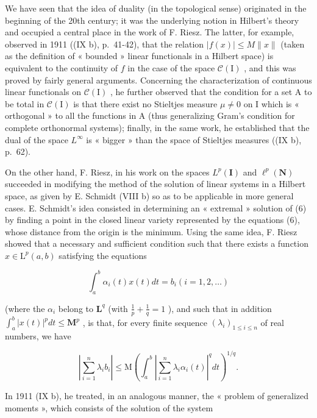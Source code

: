 We have seen that the idea of duality (in the topological sense) originated in the beginning of the 20th century; it was the underlying notion in Hilbert's theory and occupied a central place in the work of F. Riesz. The latter, for example, observed in 1911 ((IX b), p.~41-42), that the relation \(|f(x)| \leqslant M \| x\|\) (taken as the definition of « bounded » linear functionals in a Hilbert space) is equivalent to the continuity of \(f\) in the case of the space \(\mathcal{C}(\mathrm{I})\) , and this was proved by fairly general arguments. Concerning the characterization of continuous linear functionals on \(\mathcal{C}(\mathrm{I})\) , he further observed that the condition for a set A to be total in \(\mathcal{C}(\mathrm{I})\) is that there exist no Stieltjes measure \(\mu \neq 0\) on I which is « orthogonal » to all the functions in A (thus generalizing Gram's condition for complete orthonormal systems); finally, in the same work, he established that the dual of the space \(L^{\infty}\) is « bigger » than the space of Stieltjes measures ((IX b), p.~62).

On the other hand, F. Riesz, in his work on the spaces \(L^{p}(\mathbf{I})\) and \(\ell^{p}(\mathbf{N})\) succeeded in modifying the method of the solution of linear systems in a Hilbert space, as given by E. Schmidt (VIII b) so as to be applicable in more general cases. E. Schmidt's idea consisted in determining an « extremal » solution of (6) by finding a point in the closed linear variety represented by the equations (6), whose distance from the origin is the minimum. Using the same idea, F. Riesz showed that a necessary and sufficient condition such that there exists a function \(x \in \mathrm{L}^{p}(a, b)\) satisfying the equations

\[
\int_ {a} ^ {b} \alpha_ {i} (t) x (t) d t = b _ {i} (i = 1, 2, \dots)\tag{9}
\]

(where the \(\alpha_{i}\) belong to \(\mathbf{L}^q\) (with \(\frac{1}{p} +\frac{1}{q} = 1\) ), and such that in addition \(\int_{a}^{b}|x(t)|^{p}dt\leqslant \mathbf{M}^{p}\) , is that, for every finite sequence \((\lambda_i)_{1\leqslant i\leqslant n}\) of real numbers, we have

\[
\left| \sum_ {i = 1} ^ {n} \lambda_ {i} b _ {i} \right| \leqslant \mathrm{M} \left(\int_ {a} ^ {b} \left| \sum_ {i = 1} ^ {n} \lambda_ {i} \alpha_ {i} (t) \right| ^ {q} d t\right) ^ {1 / q}.\tag{10}
\]

In 1911 (IX b), he treated, in an analogous manner, the « problem of generalized moments », which consists of the solution of the system

